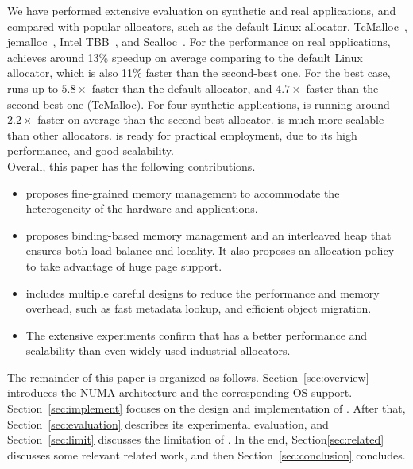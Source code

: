 We have performed extensive evaluation on synthetic and real applications, and compared \NM{} with popular allocators, such as the default Linux allocator, TcMalloc~\cite{tcmalloc}, jemalloc~\cite{jemalloc}, Intel TBB~\cite{tbb}, and Scalloc~\cite{Scalloc}. For the performance on real applications, \NM{} achieves around 13\% speedup on average comparing to the default Linux allocator, which is also 11\% faster than the second-best one. For the best case, \NM{} runs up to $5.8\times$ faster than the default allocator, and $4.7\times$ faster than the second-best one (TcMalloc). For four synthetic applications, \NM{} is running around $2.2\times$ faster on average than the second-best allocator. \NM{} is much more scalable than other allocators. \NM{} is ready for practical employment, due to its high performance, and good scalability. \\

Overall, this paper has the following contributions. 

\begin{itemize}
\item \NM{} proposes fine-grained memory management to accommodate the heterogeneity of the hardware and applications. 

\item \NM{} proposes binding-based memory management and an interleaved heap that ensures both load balance and locality. It also proposes an allocation policy to take advantage of huge page support.  
\item \NM{} includes multiple careful designs to reduce the performance and memory overhead, such as fast metadata lookup, and efficient object migration. 

\item The extensive experiments confirm that \NM{} has a better performance and scalability than even widely-used industrial allocators. 
\end{itemize}

The remainder of this paper is organized as follows. Section~\ref{sec:overview} introduces the NUMA architecture and the corresponding OS support. Section~\ref{sec:implement} focuses on the design and implementation of \NM{}. After that, Section~\ref{sec:evaluation} describes its experimental evaluation, and Section~\ref{sec:limit} discusses the limitation of \NM{}. In the end, Section\ref{sec:related} discusses some relevant related work, and then Section~\ref{sec:conclusion} concludes. 

